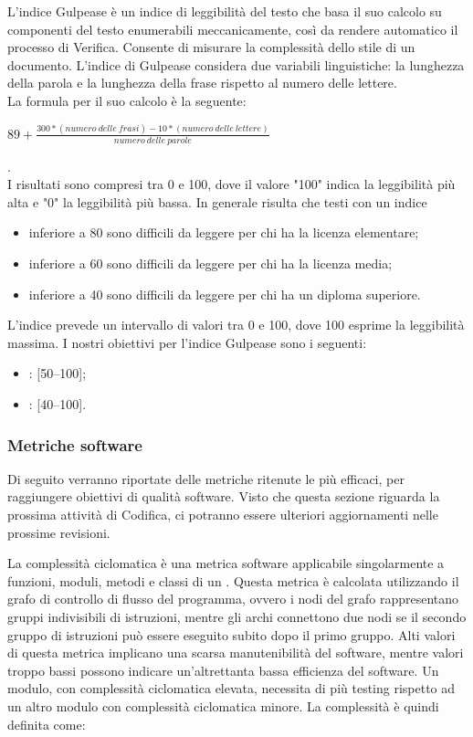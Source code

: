 L'indice Gulpease è un indice di leggibilità del testo che basa il suo calcolo su componenti del testo enumerabili meccanicamente, così da rendere automatico il processo di Verifica. Consente di misurare la complessità dello stile di un documento.
L'indice di Gulpease considera due variabili linguistiche: la lunghezza della parola e la lunghezza della frase rispetto al numero delle lettere.\\
La formula per il suo calcolo è la seguente:
\\
\begin{center}
\begin{math}
89+\frac{300*(numero\:delle\:frasi)-10*(numero\:delle\:lettere)}{numero\:delle\:parole}
\end{math}
\end{center}
.\\
I risultati sono compresi tra 0 e 100, dove il valore "100" indica la leggibilità più alta e "0" la leggibilità più bassa. In generale risulta che testi con un indice
\begin{itemize}
\item inferiore a 80 sono difficili da leggere per chi ha la licenza elementare;
\item inferiore a 60 sono difficili da leggere per chi ha la licenza media;
\item inferiore a 40 sono difficili da leggere per chi ha un diploma superiore.
\end{itemize}
L'indice prevede un intervallo di valori tra 0 e 100, dove 100 esprime la leggibilità massima.
I nostri obiettivi per l'indice Gulpease sono i seguenti:
\begin{itemize}
\item {}: [50--100];
\item {}: [40--100].
\end{itemize}

\subsubsection{Metriche software}
\label{2.9.3}
Di seguito verranno riportate delle metriche ritenute le più efficaci, per raggiungere obiettivi di qualità software. Visto che questa sezione riguarda la prossima attività di Codifica, ci potranno essere ulteriori aggiornamenti nelle prossime revisioni.

\label{4.2.1}
La complessità ciclomatica è una metrica software applicabile singolarmente a funzioni, moduli, metodi e classi di un .
Questa metrica è calcolata utilizzando il grafo di controllo di flusso del programma, ovvero i nodi del grafo rappresentano gruppi indivisibili di istruzioni, mentre gli archi connettono due nodi se il secondo gruppo di istruzioni può essere eseguito subito dopo il primo gruppo.
Alti valori di questa metrica implicano una scarsa manutenibilità del software, mentre valori troppo bassi possono indicare un'altrettanta bassa efficienza del software.
Un modulo, con complessità ciclomatica elevata, necessita di più testing rispetto ad un altro modulo con complessità ciclomatica minore.
La complessità è quindi definita come:

